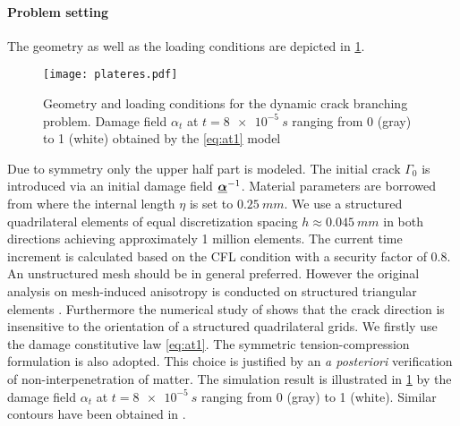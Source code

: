 \paragraph{Problem setting} The geometry as well as the loading conditions are depicted in \cref{fig:branching}.
\begin{figure}[htbp]
\centering
\texttt{[image: plateres.pdf]}
\caption{Geometry and loading conditions for the dynamic crack branching problem. Damage field $\alpha_t$ at $t=\SI{8e-5}{s}$ ranging from 0 (gray) to 1 (white) obtained by the \eqref{eq:at1} model} \label{fig:branching}
\end{figure}
Due to symmetry only the upper half part is modeled. The initial crack $\Gamma_0$ is introduced via an initial damage field $\dvec^{-1}$. Material parameters are borrowed from \cite{BordenVerhooselScottHughesLandis:2012} where the internal length $\eta$ is set to $\SI{0.25}{mm}$. We use a structured quadrilateral elements of equal discretization spacing $h\approx\SI{0.045}{mm}$ in both directions achieving approximately 1 million elements. The current time increment is calculated based on the CFL condition with a security factor of 0.8. An unstructured mesh should be in general preferred. However the original analysis on mesh-induced anisotropy is conducted on structured triangular elements \cite{Negri:1999}. Furthermore the numerical study of \cite{LorentzGodard:2011} shows that the crack direction is insensitive to the orientation of a structured quadrilateral grids. We firstly use the damage constitutive law \eqref{eq:at1}. The symmetric tension-compression formulation is also adopted. This choice is justified by an \emph{a posteriori} verification of non-interpenetration of matter. The simulation result is illustrated in \cref{fig:branching} by the damage field $\alpha_t$ at $t=\SI{8e-5}{s}$ ranging from 0 (gray) to 1 (white). Similar contours have been obtained in \cite{BordenVerhooselScottHughesLandis:2012,SchlueterWillenbuecherKuhnMueller:2014}.

